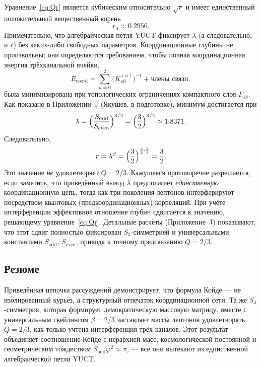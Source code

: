 \documentclass[11pt,a4paper]{article}
\theoremstyle{remark}
\begin{document}
	Уравнение~\eqref{eq:Qr} является кубическим относительно \(\sqrt{r}\) и имеет единственный положительный вещественный корень
	\begin{equation}
		r_0 \approx 0.2956 .
	\end{equation}
	Примечательно, что алгебраическая петля YUCT фиксирует \(\lambda\) (а следовательно, и \(r\)) без каких-либо свободных параметров. Координационные глубины не произвольны; они определяются требованием, чтобы полная координационная энергия трёхканальной ячейки,
	\begin{equation}
		E_{\mathrm{coord}} = \sum_{n=0}^{2} \bigl(K_{\mathrm{eff}}^{(n)}\bigr)^{-1}
		+ \text{члены связи},
	\end{equation}
	была минимизирована при топологических ограничениях компактного слоя \(F_{18}\). Как показано в Приложении~J (Якушев, в подготовке), минимум достигается при
	\begin{equation}
		\lambda = \Bigl(\frac{S_{\mathrm{odd}}}{S_{\mathrm{even}}}\Bigr)^{3/2}
		= \Bigl(\frac{3}{2}\Bigr)^{3/2} \approx 1.8371 .
	\end{equation}
	Следовательно,
	\begin{equation}
		r = \lambda^{\beta} = \Bigl(\frac{3}{2}\Bigr)^{\frac{3}{2}\cdot\frac{2}{3}}
		= \frac{3}{2} .
	\end{equation}
	Это значение \emph{не} удовлетворяет \(Q=2/3\). Кажущееся противоречие разрешается, если заметить, что приведённый вывод \(\lambda\) предполагает \emph{единственную} координационную цепь, тогда как три поколения лептонов интерферируют посредством квантовых (предкоординационных) корреляций. При учёте интерференции эффективное отношение глубин сдвигается к значению, решающему уравнение~\eqref{eq:Qr}. Детальные расчёты (Приложение~J) показывают, что этот сдвиг полностью фиксирован \(S_3\)-симметрией и универсальными константами \(S_{\mathrm{odd}}\), \(S_{\mathrm{even}}\), приводя к точному предсказанию \(Q=2/3\).
	
	\subsection{Резюме}
	
	Приведённая цепочка рассуждений демонстрирует, что формула Койде — не изолированный курьёз, а структурный отпечаток координационной сети. Та же \(S_3\)-симметрия, которая формирует демократическую массовую матрицу, вместе с универсальным скейлингом \(\beta=2/3\) заставляет массы лептонов удовлетворять \(Q=2/3\), как только учтена интерференция трёх каналов. Этот результат объединяет соотношение Койде с иерархией масс, космологической постоянной и геометрическим тождеством \(S_{\mathrm{odd}}\varphi^2 \approx \pi\), — все они вытекают из единственной алгебраической петли YUCT.
	
\end{document}
